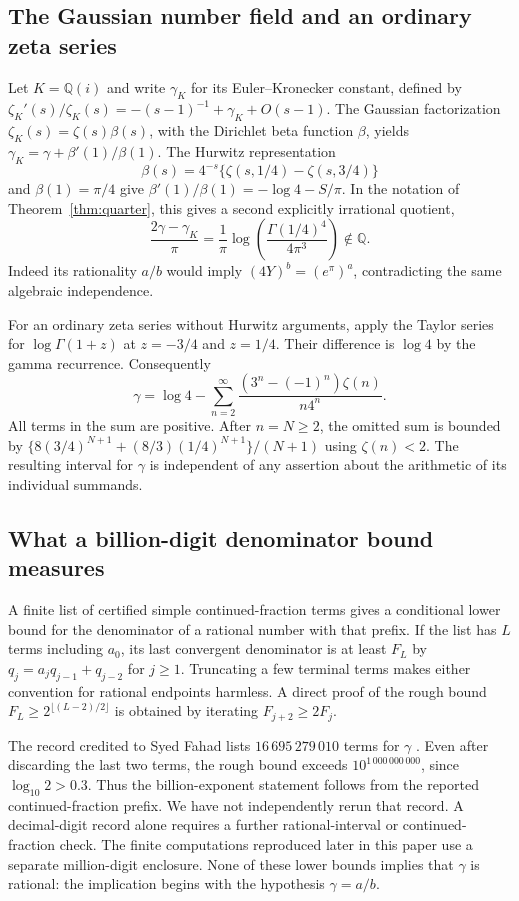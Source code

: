 \documentclass[11pt,a4paper]{article}
\theoremstyle{definition}\newtheorem{definition}[theorem]{Definition}\newtheorem{example}[theorem]{Example}
\theoremstyle{remark}\newtheorem{remark}[theorem]{Remark}
\newcommand{\Q}{\mathbb Q}\newcommand{\Z}{\mathbb Z}\newcommand{\R}{\mathbb R}\newcommand{\N}{\mathbb N}
\begin{document}
\subsection{The Gaussian number field and an ordinary zeta series}
Let $K=\Q(i)$ and write $\gamma_K$ for its Euler--Kronecker constant, defined by $\zeta_K'(s)/\zeta_K(s)=-(s-1)^{-1}+\gamma_K+O(s-1)$. The Gaussian factorization $\zeta_K(s)=\zeta(s)\beta(s)$, with the Dirichlet beta function $\beta$, yields $\gamma_K=\gamma+\beta'(1)/\beta(1)$. The Hurwitz representation
\[
 \beta(s)=4^{-s}\{\zeta(s,1/4)-\zeta(s,3/4)\}
\]
and $\beta(1)=\pi/4$ give $\beta'(1)/\beta(1)=-\log4-S/\pi$. In the notation of Theorem~\ref{thm:quarter}, this gives a second explicitly irrational quotient,
\[
 \frac{2\gamma-\gamma_K}{\pi}
 =\frac{1}{\pi}\log\!\left(\frac{\Gamma(1/4)^4}{4\pi^3}\right)\notin\Q.
\]
Indeed its rationality $a/b$ would imply $(4Y)^b=(e^\pi)^a$, contradicting the same algebraic independence.

For an ordinary zeta series without Hurwitz arguments, apply the Taylor series for $\log\Gamma(1+z)$ at $z=-3/4$ and $z=1/4$. Their difference is $\log4$ by the gamma recurrence. Consequently
\[
 \gamma=\log 4-\sum_{n=2}^{\infty}
          \frac{(3^n-(-1)^n)\zeta(n)}{n4^n}.
\]
All terms in the sum are positive. After $n=N\ge2$, the omitted sum is bounded by $\{8(3/4)^{N+1}+(8/3)(1/4)^{N+1}\}/(N+1)$ using $\zeta(n)<2$. The resulting interval for $\gamma$ is independent of any assertion about the arithmetic of its individual summands.

\subsection{What a billion-digit denominator bound measures}
A finite list of certified simple continued-fraction terms gives a conditional lower bound for the denominator of a rational number with that prefix. If the list has $L$ terms including $a_0$, its last convergent denominator is at least $F_L$ by $q_j=a_jq_{j-1}+q_{j-2}$ for $j\ge1$. Truncating a few terminal terms makes either convention for rational endpoints harmless. A direct proof of the rough bound $F_L\ge 2^{\lfloor(L-2)/2\rfloor}$ is obtained by iterating $F_{j+2}\ge2F_j$.

The record credited to Syed Fahad lists $16\,695\,279\,010$ terms for $\gamma$ \cite{Fahad}. Even after discarding the last two terms, the rough bound exceeds $10^{1\,000\,000\,000}$, since $\log_{10}2>0.3$. Thus the billion-exponent statement follows from the reported continued-fraction prefix. We have not independently rerun that record. A decimal-digit record alone requires a further rational-interval or continued-fraction check. The finite computations reproduced later in this paper use a separate million-digit enclosure. None of these lower bounds implies that $\gamma$ is rational: the implication begins with the hypothesis $\gamma=a/b$.
\end{document}
